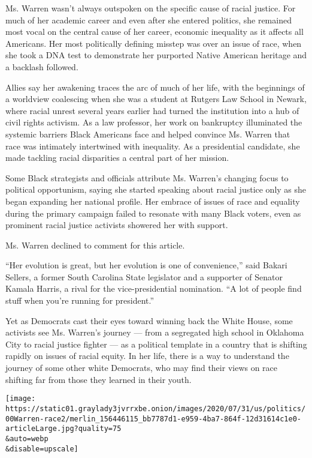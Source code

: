 Ms. Warren wasn't always outspoken on the specific cause of racial
justice. For much of her academic career and even after she entered
politics, she remained most vocal on the central cause of her career,
economic inequality as it affects all Americans. Her most politically
defining misstep was over an issue of race, when she took a DNA test to
demonstrate her purported Native American heritage and a backlash
followed.

Allies say her awakening traces the arc of much of her life, with the
beginnings of a worldview coalescing when she was a student at Rutgers
Law School in Newark, where racial unrest several years earlier had
turned the institution into a hub of civil rights activism. As a law
professor, her work on bankruptcy illuminated the systemic barriers
Black Americans face and helped convince Ms. Warren that race was
intimately intertwined with inequality. As a presidential candidate, she
made tackling racial disparities a central part of her mission.

Some Black strategists and officials attribute Ms. Warren's changing
focus to political opportunism, saying she started speaking about racial
justice only as she began expanding her national profile. Her embrace of
issues of race and equality during the primary campaign failed to
resonate with many Black voters, even as prominent racial justice
activists showered her with support.

Ms. Warren declined to comment for this article.

``Her evolution is great, but her evolution is one of convenience,''
said Bakari Sellers, a former South Carolina State legislator and a
supporter of Senator Kamala Harris, a rival for the vice-presidential
nomination. ``A lot of people find stuff when you're running for
president.''

Yet as Democrats cast their eyes toward winning back the White House,
some activists see Ms. Warren's journey --- from a segregated high
school in Oklahoma City to racial justice fighter --- as a political
template in a country that is shifting rapidly on issues of racial
equity. In her life, there is a way to understand the journey of some
other white Democrats, who may find their views on race shifting far
from those they learned in their youth.

\texttt{[image: https://static01.graylady3jvrrxbe.onion/images/2020/07/31/us/politics/00Warren-race2/merlin\_156446115\_bb7787d1-e959-4ba7-864f-12d31614c1e0-articleLarge.jpg?quality=75\\\&auto=webp\\\&disable=upscale]}


